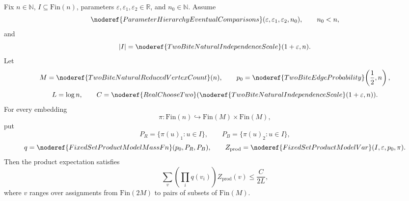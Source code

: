 \begin{helper}
Fix \(n\in\mathbb N\), \(I\subseteq\mathrm{Fin}(n)\), parameters
\(\varepsilon,\varepsilon_1,\varepsilon_2\in\mathbb R\), and
\(n_0\in\mathbb N\).  Assume
\[
\noderef{ParameterHierarchyEventualComparisons}
  (\varepsilon,\varepsilon_1,\varepsilon_2,n_0),\qquad n_0<n,
\]
and
\[
|I|=\noderef{TwoBiteNaturalIndependenceScale}(1+\varepsilon,n).
\]
Let
\[
M=\noderef{TwoBiteNaturalReducedVertexCount}(n),\qquad
p_0=\noderef{TwoBiteEdgeProbability}\!\left(\frac12,n\right),
\]
\[
L=\log n,\qquad
C=\noderef{RealChooseTwo}
  (\noderef{TwoBiteNaturalIndependenceScale}(1+\varepsilon,n)).
\]
For every embedding
\[
\pi:\mathrm{Fin}(n)\hookrightarrow\mathrm{Fin}(M)\times\mathrm{Fin}(M),
\]
put
\[
P_R=\{\pi(u)_1:u\in I\},\qquad P_B=\{\pi(u)_2:u\in I\},
\]
\[
q=\noderef{FixedSetProductModelMassFn}(p_0,P_R,P_B),
\qquad
Z_{\mathrm{prod}}=\noderef{FixedSetProductModelVar}(I,\varepsilon,p_0,\pi).
\]
Then the product expectation satisfies
\[
\sum_v\left(\prod_i q(v_i)\right)Z_{\mathrm{prod}}(v)
\le \frac{C}{2L},
\]
where \(v\) ranges over assignments from
\(\mathrm{Fin}(2M)\) to pairs of subsets of \(\mathrm{Fin}(M)\).
\end{helper}
